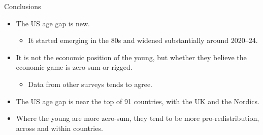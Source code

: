 \documentclass[aspectratio=169]{beamer}
\begin{document}



\begin{frame}{Conclusions}

\begin{itemize}
    \item The US age gap is new. 
    \begin{itemize}
        \item It started emerging in the 80s and widened substantially around 2020--24.
    \end{itemize}
    \item It is not the economic position of the young, but whether they believe the economic game is zero-sum or rigged. 
    \begin{itemize}
        \item Data from other surveys tends to agree.
    \end{itemize}
    \item The US age gap is near the top of 91 countries, with the UK and the Nordics. 
    \item Where the young are more zero-sum, they tend to be more pro-redistribution, across and within countries.
\end{itemize}
    
\end{frame}
\end{document}
